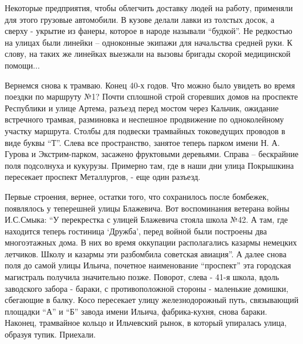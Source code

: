 Некоторые предприятия, чтобы облегчить доставку людей на работу, применяли для
этого грузовые автомобили. В кузове делали лавки из толстых досок, а сверху -
укрытие из фанеры, которое в народе называли  \enquote{будкой}. Не редкостью на улицах
были линейки – одноконные экипажи для начальства средней руки. К слову, на
таких же линейках выезжали на вызовы бригады скорой медицинской помощи...

Вернемся снова к трамваю. Конец 40-х годов. Что можно было увидеть  во время
поездки по маршруту №1? Почти сплошной строй  сгоревших домов на проспекте
Республики и улице Артема, разъезд перед мостом через Кальчик, ожидание
встречного трамвая, разминовка и неспешное продвижение по одноколейному участку
маршрута. Столбы для подвески трамвайных токоведущих проводов в виде буквы \enquote{Т}.
Слева все пространство, занятое теперь парком имени Н. А. Гурова и
Экстрим-парком, засажено фруктовыми деревьями. Справа – бескрайние поля
подсолнуха и кукурузы. Примерно там, где в наши дни улица Покрышкина пересекает
проспект Металлургов, - еще один разъезд.

Первые строения, вернее, остатки того, что сохранилось после бомбежек,
появлялось у теперешней улицы Блажевича. Вот воспоминания ветерана войны
И.С.Смыка: \enquote{У перекрестка  с улицей Блажевича стояла школа №42. А там, где
находится теперь гостиница \enquote{Дружба}, перед войной были построены два
многоэтажных дома. В них во время оккупации располагались казармы немецких
летчиков. Школу и казармы эти разбомбила советская авиация}. А далее снова поля
до самой улицы Ильича, почетное наименование \enquote{проспект}  эта городская
магистраль получила значительно позже. Поворот, слева - 41-я школа, вдоль
заводского забора -  бараки, с противоположной стороны -  маленькие домишки,
сбегающие в балку. Косо пересекает улицу железнодорожный путь, связывающий
площадки \enquote{А} и \enquote{Б} завода имени Ильича,  фабрика-кухня, снова бараки. Наконец,
трамвайное кольцо и Ильчевский рынок, в который упиралась улица, образуя тупик.
Приехали.
